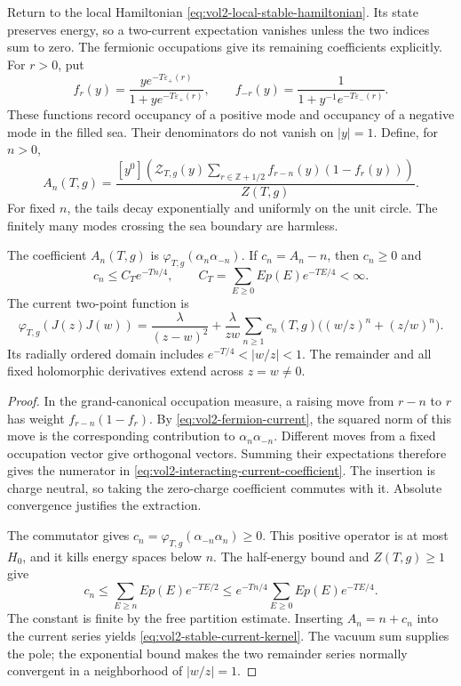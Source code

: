 Return to the local Hamiltonian \eqref{eq:vol2-local-stable-hamiltonian}.
Its state preserves energy, so a two-current expectation vanishes
unless the two indices sum to zero. The fermionic occupations give
its remaining coefficients explicitly. For \(r>0\), put
\[
 f_r(y)=\frac{y e^{-T\varepsilon_+(r)}}
                   {1+y e^{-T\varepsilon_+(r)}},\qquad
 f_{-r}(y)=\frac1{1+y^{-1}e^{-T\varepsilon_-(r)}}.
\]
These functions record occupancy of a positive mode and occupancy
of a negative mode in the filled sea. Their denominators do not
vanish on \(|y|=1\). Define, for \(n>0\),
\begin{equation}\label{eq:vol2-interacting-current-coefficient}
 A_n(T,g)=
 \frac{[y^0]\left(\mathcal Z_{T,g}(y)
       \sum_{r\in\mathbb Z+1/2}f_{r-n}(y)(1-f_r(y))\right)}{Z(T,g)}.
\end{equation}
For fixed \(n\), the tails decay exponentially and uniformly on
the unit circle. The finitely many modes crossing the sea boundary
are harmless.

\begin{proposition}\label{prop:vol2-interacting-current-pole}
The coefficient \(A_n(T,g)\) is
\(\varphi_{T,g}(\alpha_n\alpha_{-n})\). If
\(c_n=A_n-n\), then \(c_n\geq0\) and
\begin{equation}\label{eq:vol2-interacting-current-bound}
 c_n\leq C_T e^{-Tn/4},\qquad
 C_T=\sum_{E\geq0}E p(E)e^{-TE/4}<\infty.
\end{equation}
The current two-point function is
\begin{equation}\label{eq:vol2-stable-current-kernel}
 \varphi_{T,g}(J(z)J(w))
 =\frac{\lambda}{(z-w)^2}
   +\frac{\lambda}{zw}\sum_{n\geq1}c_n(T,g)
          \bigl((w/z)^n+(z/w)^n\bigr).
\end{equation}
Its radially ordered domain includes \(e^{-T/4}<|w/z|<1\).
The remainder and all fixed holomorphic derivatives extend across
\(z=w\ne0\).
\end{proposition}

\begin{proof}
In the grand-canonical occupation measure, a raising move from
\(r-n\) to \(r\) has weight \(f_{r-n}(1-f_r)\).
By \eqref{eq:vol2-fermion-current}, the squared norm of this move
is the corresponding contribution to \(\alpha_n\alpha_{-n}\).
Different moves from a fixed occupation vector give orthogonal
vectors. Summing their expectations therefore gives the numerator
in \eqref{eq:vol2-interacting-current-coefficient}. The insertion
is charge neutral, so taking the zero-charge coefficient commutes
with it. Absolute convergence justifies the extraction.

The commutator gives
\(c_n=\varphi_{T,g}(\alpha_{-n}\alpha_n)\geq0\).
This positive operator is at most \(H_0\), and it kills energy
spaces below \(n\). The half-energy bound and \(Z(T,g)\geq1\)
give
\[
 c_n\leq\sum_{E\geq n}E p(E)e^{-TE/2}
       \leq e^{-Tn/4}\sum_{E\geq0}E p(E)e^{-TE/4}.
\]
The constant is finite by the free partition estimate.
Inserting \(A_n=n+c_n\) into the current series yields
\eqref{eq:vol2-stable-current-kernel}. The vacuum sum supplies
the pole; the exponential bound makes the two remainder series
normally convergent in a neighborhood of \(|w/z|=1\).
\end{proof}


